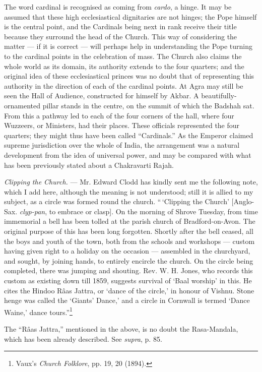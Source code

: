 \documentclass[a4paper, 11pt, oneside, polutonikogreek, english]{article}
\begin{document}
The word cardinal is recognised as coming from \emph{cardo}, a hinge. It may be assumed that these high ecclesiastical dignitaries are not hinges; the Pope himself is the central point, and the Cardinals being next in rank receive their title because they surround the head of the Church. This way of considering the matter --- if it is correct --- will perhaps help in understanding the Pope turning to the cardinal points in the celebration of mass. The Church also claims the whole world as its domain, its authority extends to the four quarters; and the original idea of these ecclesiastical princes was no doubt that of representing this authority in the direction of each of the cardinal points. At Agra may still be seen the Hall of Audience, constructed for himself by Akbar. A beautifully-ornamented pillar stands in the centre, on the summit of which the Badshah sat. From this a pathway led to each of the four corners of the hall, where four Wuzzeers, or Ministers, had their places. These officials represented the four quarters; they might thus have been called ``Cardinals.'' As the Emperor claimed supreme jurisdiction over the whole of India, the arrangement was a natural development from the idea of universal power, and may be compared with what has been previously stated about a Chakravarti Rajah.

\emph{Clipping the Church.} --- Mr. Edward Clodd has kindly sent me the following note, which I add here, although the meaning is not understood; still it is allied to my subject, as a circle was formed round the church. ``\,`Clipping the Church' [Anglo-Sax. \emph{clyp-pan}, to embrace or clasp]. On the morning of Shrove Tuesday, from time immemorial a bell has been tolled at the parish church of Bradford-on-Avon. The original purpose of this has been long forgotten. Shortly after the bell ceased, all the boys and youth of the town, both from the schools and workshops --- custom having given right to a holiday on the occasion --- assembled in the churchyard, and sought, by joining hands, to entirely encircle the church. On the circle being completed, there was jumping and shouting. Rev. W. H. Jones, who records this custom as existing down till 1859, suggests survival of `Baal worship' in this. He cites the Hindoo Râas Jattra, or `dance of the circle,' in honour of Vishnu. Stone henge was called the `Giants' Dance,' and a circle in Cornwall is termed `Dance Waine,' dance tours.''\footnote{Vaux's \emph{Church Folklore}, pp. 19, 20 (1894).}

The ``Râas Jattra,'' mentioned in the above, is no doubt the Rasa-Mandala, which has been already described. See \emph{supra}, p. 85.
\end{document}
